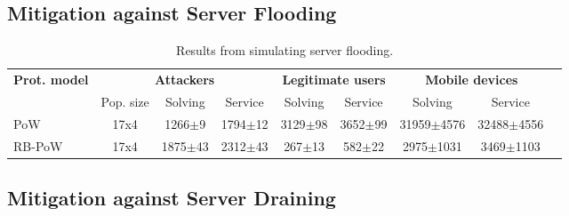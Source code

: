 \subsection{Mitigation against Server Flooding}
  \begin{table}[H]
    \centering
    \tiny
    \caption{Results from simulating server flooding. }\label{tab:flooding}

    \begin{tabularx}{1.05\textwidth}{lcccccccr} \toprule
      \multicolumn{1}{c}{\textbf{Prot. model}} & \multicolumn{3}{c}{\textbf{Attackers}} & \multicolumn{2}{c}{\textbf{Legitimate users}} & \multicolumn{2}{c}{\textbf{Mobile devices}} \\
      \multicolumn{1}{c}{} & \multicolumn{1}{c}{Pop. size} & \multicolumn{1}{c}{Solving} & \multicolumn{1}{c}{Service} & \multicolumn{1}{c}{Solving} & \multicolumn{1}{c}{Service} & \multicolumn{1}{c}{Solving} & \multicolumn{1}{c}{Service}  \\ \toprule
      PoW & 17x4  & 1266$\pm$9 & 1794$\pm$12 & 3129$\pm$98 & 3652$\pm$99 & 31959$\pm$4576 & 32488$\pm$4556    \\
      RB-PoW & 17x4 & 1875$\pm$43 & 2312$\pm$43 & 267$\pm$13 & 582$\pm$22 & 2975$\pm$1031 & 3469$\pm$1103   \\ \bottomrule
    \end{tabularx}

  \end{table}


\subsection{Mitigation against Server Draining}

